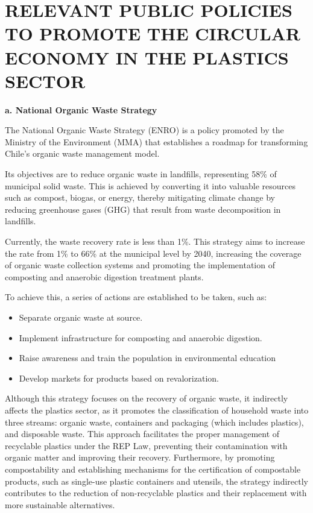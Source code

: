 \documentclass[
  12pt,
  oneside]{book}
\providecommand{\tightlist}{%
  \setlength{\itemsep}{0pt}\setlength{\parskip}{0pt}}
\begin{document}
\section{RELEVANT PUBLIC POLICIES TO PROMOTE THE CIRCULAR ECONOMY IN THE
PLASTICS
SECTOR}\label{relevant-public-policies-to-promote-the-circular-economy-in-the-plastics-sector}

\textbf{a. National Organic Waste Strategy}

The National Organic Waste Strategy (ENRO) is a policy promoted by the
Ministry of the Environment (MMA) that establishes a roadmap for
transforming Chile's organic waste management model.

Its objectives are to reduce organic waste in landfills, representing
58\% of municipal solid waste. This is achieved by converting it into
valuable resources such as compost, biogas, or energy, thereby
mitigating climate change by reducing greenhouse gases (GHG) that result
from waste decomposition in landfills.

Currently, the waste recovery rate is less than 1\%. This strategy aims
to increase the rate from 1\% to 66\% at the municipal level by 2040,
increasing the coverage of organic waste collection systems and
promoting the implementation of composting and anaerobic digestion
treatment plants.

To achieve this, a series of actions are established to be taken, such
as:

\begin{itemize}
\tightlist
\item
  Separate organic waste at source.
\item
  Implement infrastructure for composting and anaerobic digestion.
\item
  Raise awareness and train the population in environmental education
\item
  Develop markets for products based on revalorization.
\end{itemize}

Although this strategy focuses on the recovery of organic waste, it
indirectly affects the plastics sector, as it promotes the
classification of household waste into three streams: organic waste,
containers and packaging (which includes plastics), and disposable
waste. This approach facilitates the proper management of recyclable
plastics under the REP Law, preventing their contamination with organic
matter and improving their recovery. Furthermore, by promoting
compostability and establishing mechanisms for the certification of
compostable products, such as single-use plastic containers and
utensils, the strategy indirectly contributes to the reduction of
non-recyclable plastics and their replacement with more sustainable
alternatives.
\end{document}

